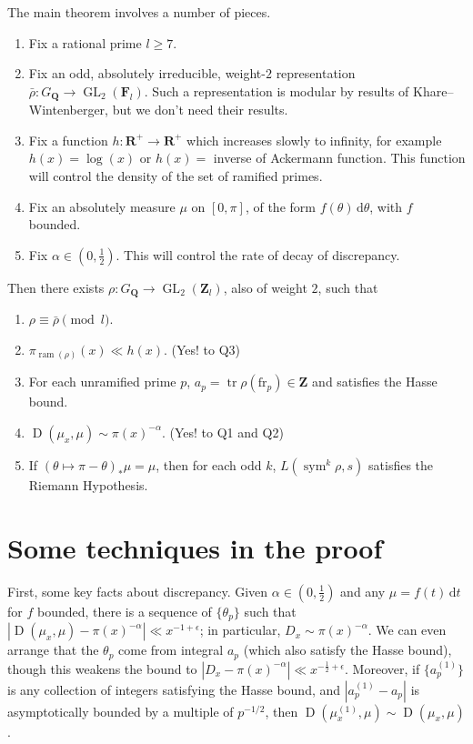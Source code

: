 \documentclass{article}
\DeclareMathOperator{\D}{D}
\DeclareMathOperator{\GL}{GL}
\DeclareMathOperator{\ram}{ram}
\DeclareMathOperator{\sym}{sym}
\DeclareMathOperator{\tr}{tr}
\newcommand{\bF}{\mathbf{F}}
\newcommand{\bQ}{\mathbf{Q}}
\newcommand{\bR}{\mathbf{R}}
\newcommand{\bZ}{\mathbf{Z}}
\newcommand{\dd}{\mathrm{d}}
\newcommand{\frob}{\mathrm{fr}}
\begin{document}
The main theorem involves a number of pieces.
\begin{enumerate}
\item
Fix a rational prime $l\geqslant 7$. 

\item
Fix an odd, absolutely irreducible, weight-$2$ representation 
$\bar\rho\colon G_\bQ \to \GL_2(\bF_l)$. Such a representation is modular by 
results of Khare--Wintenberger, but we don't need their results. 

\item
Fix a function $h\colon \bR^+ \to \bR^+$ which increases slowly to infinity, 
for example $h(x) = \log(x)$ or $h(x) = $ inverse of Ackermann function. This 
function will control the density of the set of ramified primes. 

\item
Fix an absolutely measure $\mu$ on $[0,\pi]$, of the form 
$f(\theta)\, \dd \theta$, with $f$ bounded. 

\item
Fix $\alpha\in \left(0,\frac 1 2\right)$. This will control the rate of decay 
of discrepancy. 
\end{enumerate}
Then there exists $\rho\colon G_\bQ \to \GL_2(\bZ_l)$, also of weight $2$, 
such that 
\begin{enumerate}
\item
$\rho\equiv \bar\rho\pmod l$. 

\item
$\pi_{\ram(\rho)}(x) \ll h(x)$. (Yes! to Q3)

\item
For each unramified prime $p$, $a_p = \tr \rho(\frob_p)\in \bZ$ and satisfies 
the Hasse bound. 

\item
$\D(\mu_x,\mu) \sim \pi(x)^{-\alpha}$. (Yes! to Q1 and Q2)

\item
If $(\theta\mapsto \pi - \theta)_\ast \mu = \mu$, then for each odd 
$k$, $L(\sym^k \rho,s)$ satisfies the Riemann Hypothesis. 
\end{enumerate}





\section{Some techniques in the proof}

First, some key facts about discrepancy. 
Given $\alpha\in \left(0,\frac 1 2\right)$ and any $\mu = f(t)\, \dd t$ for $f$ 
bounded, there is a sequence of $\{\theta_p\}$ such that 
$|\D(\mu_x,\mu) - \pi(x)^{-\alpha}| \ll x^{-1+\epsilon}$; in particular, 
$D_x \sim \pi(x)^{-\alpha}$. We can even arrange that the $\theta_p$ come 
from integral $a_p$ (which also satisfy the Hasse bound), though this weakens 
the bound to $|D_x - \pi(x)^{-\alpha}| \ll x^{-\frac 1 2+\epsilon}$. Moreover, 
if $\{a_p^{(1)}\}$ is any collection of integers satisfying the Hasse bound, and 
$|a_p^{(1)} - a_p|$ is asymptotically bounded by a multiple of $p^{-1/2}$, then 
$\D(\mu_x^{(1)},\mu) \sim \D(\mu_x,\mu)$. 
\end{document}
